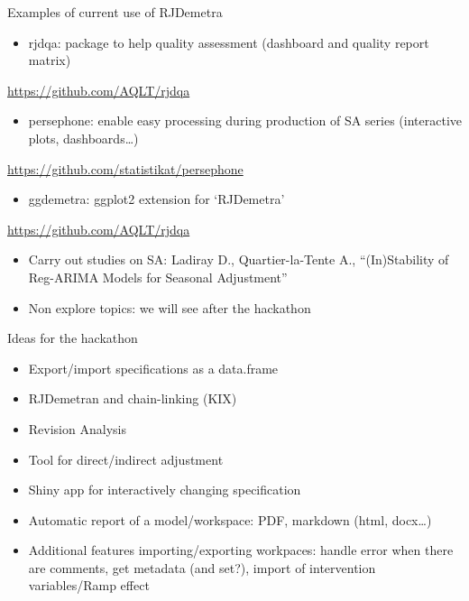 \documentclass[10pt,xcolor=table,color={dvipsnames,usenames},ignorenonframetext,usepdftitle=false,french]{beamer}
\providecommand{\tightlist}{%
  \setlength{\parskip}{0pt}
  }
\begin{document}
\begin{frame}{Examples of current use of RJDemetra}
\protect\hypertarget{examples-of-current-use-of-rjdemetra}{}

\begin{itemize}
\tightlist
\item
  rjdqa: package to help quality assessment (dashboard and quality
  report matrix)
\end{itemize}

\faGithub{} \url{https://github.com/AQLT/rjdqa}

\begin{itemize}
\tightlist
\item
  persephone: enable easy processing during production of SA series
  (interactive plots, dashboards\ldots{})
\end{itemize}

\faGithub{} \url{https://github.com/statistikat/persephone}

\begin{itemize}
\tightlist
\item
  ggdemetra: ggplot2 extension for `RJDemetra'
\end{itemize}

\faGithub{} \url{https://github.com/AQLT/rjdqa}

\begin{itemize}
\item
  Carry out studies on SA: Ladiray D., Quartier-la-Tente A.,
  ``(In)Stability of Reg-ARIMA Models for Seasonal Adjustment''
\item
  Non explore topics: we will see after the hackathon
\end{itemize}

\end{frame}

\begin{frame}{Ideas for the hackathon}
\protect\hypertarget{ideas-for-the-hackathon}{}

\begin{itemize}
\item
  Export/import specifications as a data.frame
\item
  RJDemetran and chain-linking (KIX)
\item
  Revision Analysis
\item
  Tool for direct/indirect adjustment
\item
  Shiny app for interactively changing specification
\item
  Automatic report of a model/workspace: PDF, markdown (html,
  docx\ldots{})
\item
  Additional features importing/exporting workpaces: handle error when
  there are comments, get metadata (and set?), import of intervention
  variables/Ramp effect
\end{itemize}

\end{frame}
\end{document}
